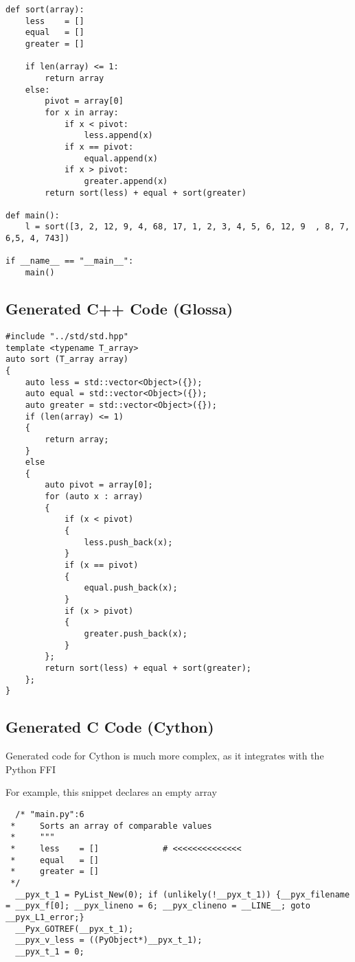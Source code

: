 \documentclass{article}
\begin{document}
\lstset{language=Python}
\begin{lstlisting}
def sort(array):
    less    = []
    equal   = []
    greater = []

    if len(array) <= 1:
        return array
    else:
        pivot = array[0]
        for x in array:
            if x < pivot:
                less.append(x)
            if x == pivot:
                equal.append(x)
            if x > pivot:
                greater.append(x)
        return sort(less) + equal + sort(greater)

def main():
    l = sort([3, 2, 12, 9, 4, 68, 17, 1, 2, 3, 4, 5, 6, 12, 9  , 8, 7, 6,5, 4, 743])

if __name__ == "__main__":
    main()
\end{lstlisting}

\lstset{language=C}

\newpage
\subsection{Generated C++ Code (Glossa)}

\begin{lstlisting}
#include "../std/std.hpp"
template <typename T_array>
auto sort (T_array array)
{
    auto less = std::vector<Object>({});
    auto equal = std::vector<Object>({});
    auto greater = std::vector<Object>({});
    if (len(array) <= 1)
    {
        return array;
    }
    else
    {
        auto pivot = array[0];
        for (auto x : array)
        {
            if (x < pivot)
            {
                less.push_back(x);
            }
            if (x == pivot)
            {
                equal.push_back(x);
            }
            if (x > pivot)
            {
                greater.push_back(x);
            }
        };
        return sort(less) + equal + sort(greater);
    };
}
\end{lstlisting}

\newpage
\subsection{Generated C Code (Cython)}

Generated code for Cython is much more complex, as it integrates with the Python FFI

For example, this snippet declares an empty array

\begin{lstlisting}
  /* "main.py":6
 *     Sorts an array of comparable values
 *     """
 *     less    = []             # <<<<<<<<<<<<<<
 *     equal   = []
 *     greater = []
 */
  __pyx_t_1 = PyList_New(0); if (unlikely(!__pyx_t_1)) {__pyx_filename = __pyx_f[0]; __pyx_lineno = 6; __pyx_clineno = __LINE__; goto __pyx_L1_error;}
  __Pyx_GOTREF(__pyx_t_1);
  __pyx_v_less = ((PyObject*)__pyx_t_1);
  __pyx_t_1 = 0;
\end{lstlisting}
\end{document}
